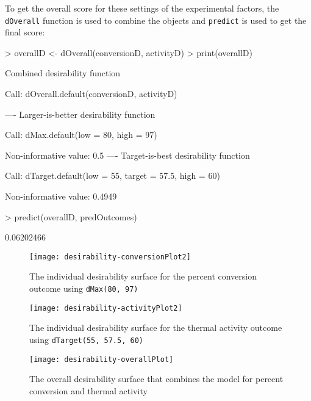 \documentclass[12pt]{article}
\begin{document}
To get the overall score for these settings of the experimental factors, the \texttt{dOverall} function is used to combine the objects and \texttt{predict} is used to get the final score:

{\small
\begin{Schunk}
\begin{Sinput}
> overallD <- dOverall(conversionD, activityD)
> print(overallD)
\end{Sinput}
\begin{Soutput}
Combined desirability function

Call: dOverall.default(conversionD, activityD)

----
Larger-is-better desirability function

Call: dMax.default(low = 80, high = 97)

Non-informative value: 0.5 
----
Target-is-best desirability function

Call: dTarget.default(low = 55, target = 57.5, high = 60)

Non-informative value: 0.4949 
\end{Soutput}
\begin{Sinput}
> predict(overallD, predOutcomes)
\end{Sinput}
\begin{Soutput}
[1] 0.06202466
\end{Soutput}
\end{Schunk}
}



\begin{figure}[p]
   \begin{center}		
\texttt{[image: desirability-conversionPlot2]}
      \caption{The individual desirability surface for the percent conversion outcome using \texttt{dMax(80, 97)}}
      \label{f:conversionDesire}         
   \end{center}
\end{figure}


\begin{figure}[p]
   \begin{center}		
\texttt{[image: desirability-activityPlot2]}
      \caption{The individual desirability surface for the thermal activity outcome using \texttt{dTarget(55, 57.5, 60)}}
      \label{f:activityDesire}         
   \end{center}
\end{figure}


\begin{figure}[p]
   \begin{center}		
\texttt{[image: desirability-overallPlot]}
      \caption{The overall desirability surface that combines the model for percent conversion and thermal activity}
      \label{f:Overall}         
   \end{center}
\end{figure}
\end{document}
